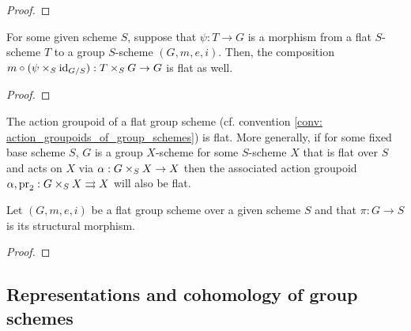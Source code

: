                 \begin{proof}
                    
                \end{proof}
            \begin{lemma} \label{lemma: flatness_criterion_for_action_groupoids_of_group_schemes}
                For some given scheme $S$, suppose that $\psi: T \to G$ is a morphism from a flat $S$-scheme $T$ to a group $S$-scheme $(G, m, e, i)$. Then, the composition $m \circ (\psi \x_S \id_{G/S}): T \x_S G \to G$ is flat as well.
            \end{lemma}
                \begin{proof}
                    
                \end{proof}
            \begin{corollary}
                The action groupoid of a flat group scheme (cf. convention \ref{conv: action_groupoids_of_group_schemes}) is flat. More generally, if for some fixed base scheme $S$, $G$ is a group $X$-scheme for some $S$-scheme $X$ that is flat over $S$ and acts on $X$ via $\alpha: G \x_S X \to X$ then the associated action groupoid $\alpha, \pr_2: G \x_S X \toto X$ will also be flat.
            \end{corollary}
            \begin{proposition} \label{prop: differential_forms_on_group_schemes}
                Let $(G, m, e, i)$ be a flat group scheme over a given scheme $S$ and that $\pi: G \to S$ is its structural morphism. 
            \end{proposition}
                \begin{proof}
                    
                \end{proof}
                
    \subsection{Representations and cohomology of group schemes}
